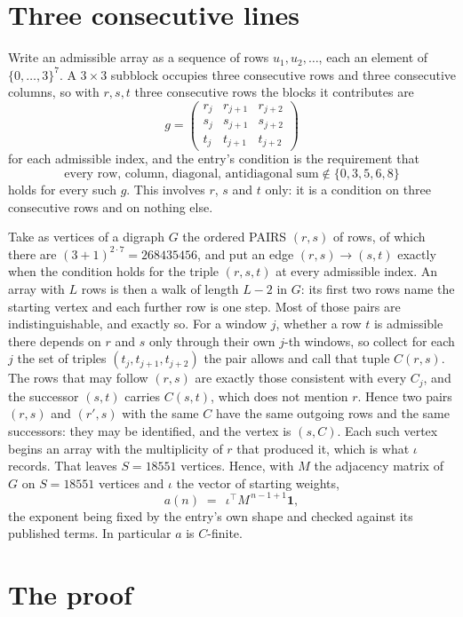 \documentclass[11pt,a4paper]{article}
\theoremstyle{plain}
\theoremstyle{definition}
\begin{document}
\section{Three consecutive lines}

Write an admissible array as a sequence of rows $u_1,u_2,\dots$, each an element of
$\{0,\dots,3\}^{7}$. A $3\times3$ subblock occupies three consecutive rows and
three consecutive columns, so with $r,s,t$ three consecutive rows the blocks it
contributes are
\[
g=\begin{pmatrix}r_j&r_{j+1}&r_{j+2}\\ s_j&s_{j+1}&s_{j+2}\\ t_j&t_{j+1}&t_{j+2}\end{pmatrix}
\]
for each admissible index, and the entry's condition is the requirement that
\[
\text{every row, column, diagonal, antidiagonal sum} \notin \{0,3,5,6,8\}
\]
holds for every such $g$. This involves $r$, $s$ and $t$ only: it is a condition on
three consecutive rows and on nothing else.

Take as vertices of a digraph $G$ the ordered PAIRS $(r,s)$ of rows, of which there are
$(3+1)^{2\cdot7}=268435456$, and put an edge $(r,s)\to(s,t)$ exactly when the condition
holds for the triple $(r,s,t)$ at every admissible index. An array with $L$ rows is then a
walk of length $L-2$ in $G$: its first two rows name the starting vertex and each further
row is one step. Most of those pairs are indistinguishable, and exactly so. For a window $j$, whether a row $t$ is admissible there depends on $r$ and $s$ only through their own $j$-th windows, so collect for each $j$ the set of triples $(t_j,t_{j+1},t_{j+2})$ the pair allows and call that tuple $C(r,s)$. The rows that may follow $(r,s)$ are exactly those consistent with every $C_j$, and the successor $(s,t)$ carries $C(s,t)$, which does not mention $r$. Hence two pairs $(r,s)$ and $(r',s)$ with the same $C$ have the same outgoing rows and the same successors: they may be identified, and the vertex is $(s,C)$. Each such vertex begins an array with the multiplicity of $r$ that produced it, which is what $\iota$ records. That leaves $S=18551$ vertices. Hence, with $M$ the adjacency matrix of $G$ on $S=18551$ vertices and
$\iota$ the vector of starting weights,
\[
a(n)\;=\;\,\iota^{\!\top}M^{\,n-1+1}\mathbf{1},
\]
the exponent being fixed by the entry's own shape and checked against its published terms.
In particular $a$ is $C$-finite.

\section{The proof}
\end{document}
